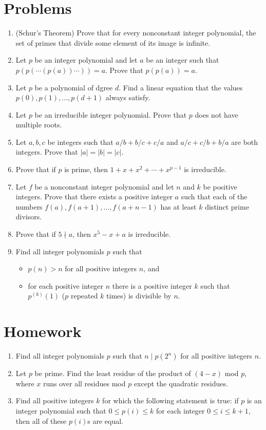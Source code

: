 \documentclass{article}
\begin{document}
\section{Problems}
\begin{enumerate}
  \item (Schur's Theorem) Prove that for every nonconstant integer polynomial,
    the set of primes that divide some element of its image is infinite.
  \item Let $p$ be an integer polynomial and let $a$ be an integer such that
    $p(p(\cdots(p(a))\cdots))=a$. Prove that $p(p(a))=a$.
  \item Let $p$ be a polynomial of dgree $d$. Find a linear
    equation that the values $p(0),p(1),\ldots,p(d+1)$ always satisfy.
  \item Let $p$ be an irreducible integer polynomial. Prove that $p$ does not
    have multiple roots.
  \item Let $a,b,c$ be integers such that $a/b+b/c+c/a$ and $a/c+c/b+b/a$ are
    both integers. Prove that $|a|=|b|=|c|$.
  \item Prove that if $p$ is prime, then $1+x+x^2+\cdots+x^{p-1}$ is
    irreducible.
  \item Let $f$ be a nonconstant integer polynomial and let $n$ and $k$ be
    positive integers. Prove that there exists a positive integer $a$ such that
    each of the numbers $f(a),f(a+1),\ldots,f(a+n-1)$ has at least $k$ distinct
    prime divisors.
  \item Prove that if $5\nmid a$, then $x^5-x+a$ is irreducible.
  \item Find all integer polynomials $p$ such that
    \begin{itemize}
      \item $p(n)>n$ for all positive integers $n$, and
      \item for each positive integer $n$ there is a positive integer $k$ such
        that $p^{(k)}(1)$ ($p$ repeated $k$ times) is divisible by $n$.
    \end{itemize}
\end{enumerate}
\newpage
\section{Homework}
\begin{enumerate}
  \item Find all integer polynomials $p$ such that $n\mid p(2^n)$ for all
    positive integers $n$.
  \item Let $p$ be prime. Find the least residue of the product of $(4-x)$ mod $p$, where $x$ runs
    over all residues mod $p$ except the quadratic residues.
  \item Find all positive integers $k$ for which the following statement is
    true: if $p$ is an integer polynomial such that $0\le p(i)\le k$ for each
    integer $0\le i\le k+1$, then all of these $p(i)$s are equal.
\end{enumerate}
\end{document}
